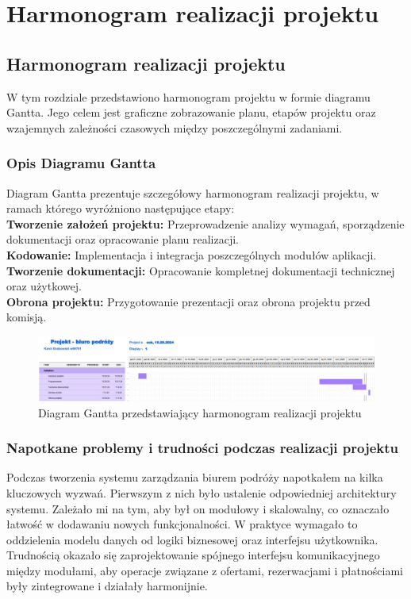 ﻿%
\chapter{Harmonogram realizacji projektu}
\section{Harmonogram realizacji projektu}
W tym rozdziale przedstawiono harmonogram projektu w formie diagramu Gantta. Jego celem jest graficzne zobrazowanie planu, etapów projektu oraz wzajemnych zależności czasowych między poszczególnymi zadaniami.

\subsection{Opis Diagramu Gantta}
Diagram Gantta prezentuje szczegółowy harmonogram realizacji projektu, w ramach którego wyróżniono następujące etapy:\\
\noindent\textbf{Tworzenie założeń projektu:} Przeprowadzenie analizy wymagań, sporządzenie dokumentacji oraz opracowanie planu realizacji.\\[1ex]
\noindent\textbf{Kodowanie:} Implementacja i integracja poszczególnych modułów aplikacji.\\[1ex]
\noindent\textbf{Tworzenie dokumentacji:} Opracowanie kompletnej dokumentacji technicznej oraz użytkowej.\\[1ex]
\noindent\textbf{Obrona projektu:} Przygotowanie prezentacji oraz obrona projektu przed komisją.


\begin{figure}[htbp]
  \centering
  \includegraphics[width=1.1\textwidth]{figures/diagram_gannta.jpg} 
  \caption{Diagram Gantta przedstawiający harmonogram realizacji projektu}
  \label{fig:obrazek}
\end{figure}
\subsection{Napotkane problemy i trudności podczas realizacji projektu}
Podczas tworzenia systemu zarządzania biurem podróży napotkałem na kilka kluczowych wyzwań. Pierwszym z nich było ustalenie odpowiedniej architektury systemu. Zależało mi na tym, aby był on modułowy i skalowalny, co oznaczało łatwość w dodawaniu nowych funkcjonalności. W praktyce wymagało to oddzielenia modelu danych od logiki biznesowej oraz interfejsu użytkownika. Trudnością okazało się zaprojektowanie spójnego interfejsu komunikacyjnego między modułami, aby operacje związane z ofertami, rezerwacjami i płatnościami były zintegrowane i działały harmonijnie.

